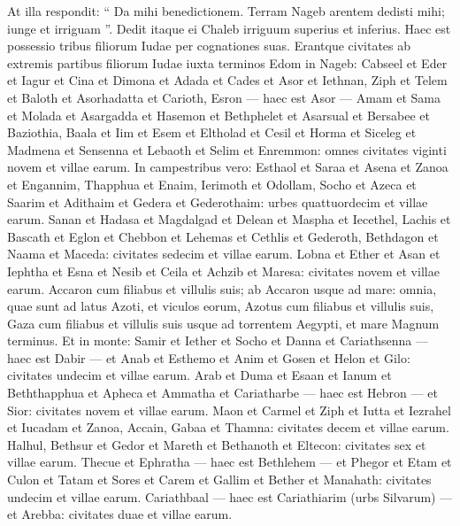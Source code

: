 \begin{biblechapter}
\begin{biblechapter}
\begin{biblechapter}
\begin{biblechapter}
\begin{biblechapter}
\begin{biblechapter}
\begin{biblechapter}
\begin{biblechapter}
\begin{biblechapter}
\begin{biblechapter}
\begin{biblechapter}
\begin{biblechapter}
\begin{biblechapter}
\begin{biblechapter}
\begin{biblechapter}
\verse At illa respondit: “ Da mihi benedictionem. Terram Nageb arentem dedisti mihi; iunge et irriguam ”. Dedit itaque ei Chaleb irriguum superius et inferius.
 \verse Haec est possessio tribus filiorum Iudae per cognationes suas. 
\verse Erantque civitates ab extremis partibus filiorum Iudae iuxta terminos Edom in Nageb: Cabseel et Eder et Iagur 
\verse et Cina et Dimona et Adada 
\verse et Cades et Asor et Iethnan, 
\verse Ziph et Telem et Baloth 
\verse et Asorhadatta et Carioth, Esron — haec est Asor — 
\verse Amam et Sama et Molada 
\verse et Asargadda et Hasemon et Bethphelet 
\verse et Asarsual et Bersabee et Baziothia, 
\verse Baala et Iim et Esem 
\verse et Eltholad et Cesil et Horma 
\verse et Siceleg et Madmena et Sensenna 
\verse et Lebaoth et Selim et Enremmon: omnes civitates viginti novem et villae earum.
 \verse In campestribus vero: Esthaol et Saraa et Asena 
\verse et Zanoa et Engannim, Thapphua et Enaim, 
\verse Ierimoth et Odollam, Socho et Azeca 
\verse et Saarim et Adithaim et Gedera et Gederothaim: urbes quattuordecim et villae earum. 
 \verse Sanan et Hadasa et Magdalgad 
\verse et Delean et Maspha et Iecethel, 
\verse Lachis et Bascath et Eglon 
\verse et Chebbon et Lehemas et Cethlis 
\verse et Gederoth, Bethdagon et Naama et Maceda: civitates sedecim et villae earum. 
 \verse Lobna et Ether et Asan 
\verse et Iephtha et Esna et Nesib 
\verse et Ceila et Achzib et Maresa: civitates novem et villae earum. 
\verse Accaron cum filiabus et villulis suis; 
\verse ab Accaron usque ad mare: omnia, quae sunt ad latus Azoti, et viculos eorum, 
\verse Azotus cum filiabus et villulis suis, Gaza cum filiabus et villulis suis usque ad torrentem Aegypti, et mare Magnum terminus.
 \verse Et in monte: Samir et Iether et Socho 
\verse et Danna et Cariathsenna — haec est Dabir — 
\verse et Anab et Esthemo et Anim 
\verse et Gosen et Helon et Gilo: civitates undecim et villae earum. 
\verse Arab et Duma et Esaan 
\verse et Ianum et Beththapphua et Apheca 
\verse et Ammatha et Cariatharbe — haec est Hebron — et Sior: civitates novem et villae earum. 
\verse Maon et Carmel et Ziph et Iutta 
 \verse et Iezrahel et Iucadam et Zanoa, 
\verse Accain, Gabaa et Thamna: civitates decem et villae earum. 
\verse Halhul, Bethsur et Gedor 
\verse et Mareth et Bethanoth et Eltecon: civitates sex et villae earum. Thecue et Ephratha — haec est Bethlehem — et Phegor et Etam et Culon et Tatam et Sores et Carem et Gallim et Bether et Manahath: civitates undecim et villae earum. 
\verse Cariathbaal — haec est Cariathiarim (urbs Silvarum) — et Arebba: civitates duae et villae earum.

\end{biblechapter}
\end{biblechapter}
\end{biblechapter}
\end{biblechapter}
\end{biblechapter}
\end{biblechapter}
\end{biblechapter}
\end{biblechapter}
\end{biblechapter}
\end{biblechapter}
\end{biblechapter}
\end{biblechapter}
\end{biblechapter}
\end{biblechapter}
\end{biblechapter}
